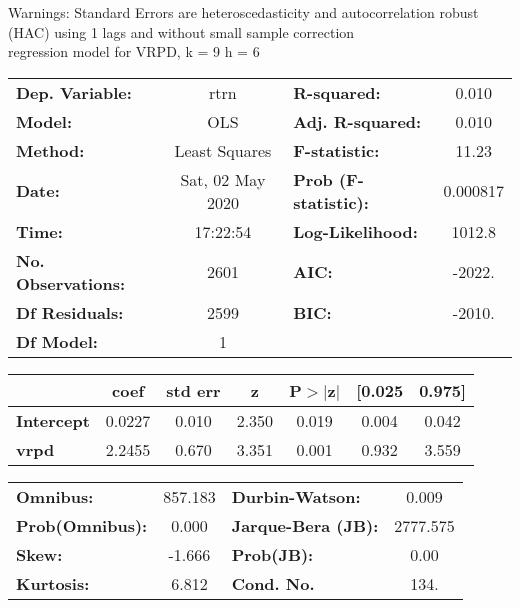 Warnings: \newline
 [1] Standard Errors are heteroscedasticity and autocorrelation robust (HAC) using 1 lags and without small sample correction\\ 

regression model for VRPD, k = 9 h = 6\begin{center}
\begin{tabular}{lclc}
\toprule
\textbf{Dep. Variable:}    &       rtrn       & \textbf{  R-squared:         } &     0.010   \\
\textbf{Model:}            &       OLS        & \textbf{  Adj. R-squared:    } &     0.010   \\
\textbf{Method:}           &  Least Squares   & \textbf{  F-statistic:       } &     11.23   \\
\textbf{Date:}             & Sat, 02 May 2020 & \textbf{  Prob (F-statistic):} &  0.000817   \\
\textbf{Time:}             &     17:22:54     & \textbf{  Log-Likelihood:    } &    1012.8   \\
\textbf{No. Observations:} &        2601      & \textbf{  AIC:               } &    -2022.   \\
\textbf{Df Residuals:}     &        2599      & \textbf{  BIC:               } &    -2010.   \\
\textbf{Df Model:}         &           1      & \textbf{                     } &             \\
\bottomrule
\end{tabular}
\begin{tabular}{lcccccc}
                   & \textbf{coef} & \textbf{std err} & \textbf{z} & \textbf{P$> |$z$|$} & \textbf{[0.025} & \textbf{0.975]}  \\
\midrule
\textbf{Intercept} &       0.0227  &        0.010     &     2.350  &         0.019        &        0.004    &        0.042     \\
\textbf{vrpd}      &       2.2455  &        0.670     &     3.351  &         0.001        &        0.932    &        3.559     \\
\bottomrule
\end{tabular}
\begin{tabular}{lclc}
\textbf{Omnibus:}       & 857.183 & \textbf{  Durbin-Watson:     } &    0.009  \\
\textbf{Prob(Omnibus):} &   0.000 & \textbf{  Jarque-Bera (JB):  } & 2777.575  \\
\textbf{Skew:}          &  -1.666 & \textbf{  Prob(JB):          } &     0.00  \\
\textbf{Kurtosis:}      &   6.812 & \textbf{  Cond. No.          } &     134.  \\
\bottomrule
\end{tabular}
\end{center}

